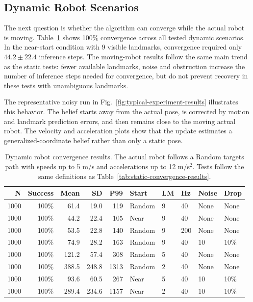 \subsection{Dynamic Robot Scenarios}
\label{subsec:experiments-dynamic}

The next question is whether the algorithm can converge while the actual robot is moving. Table~\ref{tab:dynamic-convergence-results} shows 100\% convergence across all tested dynamic scenarios. In the near-start condition with 9 visible landmarks, convergence required only $44.2 \pm 22.4$ inference steps. The moving-robot results follow the same main trend as the static tests: fewer available landmarks, noise and obstruction increase the number of inference steps needed for convergence, but do not prevent recovery in these tests with unambiguous landmarks.

The representative noisy run in Fig.~\ref{fig:typical-experiment-results} illustrates this behavior. The belief starts away from the actual pose, is corrected by motion and landmark prediction errors, and then remains close to the moving actual robot. The velocity and acceleration plots show that the update estimates a generalized-coordinate belief rather than only a static pose.

\begin{table}[!htbp]
    \centering
    \caption{\scriptsize Dynamic robot convergence results. The actual robot follows a Random targets path with speeds up to 5 m/s and accelerations up to 12 m/s$^2$. Tests follow the same definitions as Table~\ref{tab:static-convergence-results}.}
    \label{tab:dynamic-convergence-results}
    \scriptsize
    \begin{tabular}{rrrrrlllll}
        \toprule
        N & Success & Mean & SD & P99 & Start & LM & Hz & Noise & Drop \\
        \midrule
        1000 & 100\% & 61.4 & 19.0 & 119 & Random & 9 & 40 & None & None \\
        1000 & 100\% & 44.2 & 22.4 & 105 & Near & 9 & 40 & None & None \\
        1000 & 100\% & 53.5 & 22.8 & 140 & Random & 9 & 200 & None & None \\
        1000 & 100\% & 74.9 & 28.2 & 163 & Random & 9 & 40 & 10 & 10\% \\
        1000 & 100\% & 121.2 & 57.4 & 308 & Random & 5 & 40 & None & None \\
        1000 & 100\% & 388.5 & 248.8 & 1313 & Random & 2 & 40 & None & None \\
        1000 & 100\% & 93.6 & 60.5 & 267 & Near & 5 & 40 & 10 & 10\% \\
        1000 & 100\% & 289.4 & 234.6 & 1157 & Near & 2 & 40 & 10 & 10\% \\
        \bottomrule
    \end{tabular}
\end{table}
\FloatBarrier

